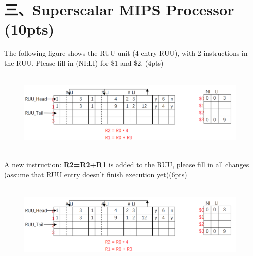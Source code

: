 \documentclass[UTF8]{ctexart}
\begin{document}
\section*{三、Superscalar MIPS Processor (10pts)}
The following figure shows the RUU unit (4-entry RUU), with 2 instructions in the RUU. Please fill in (NI:LI) for \$1 and \$2. (4pts)\\
\begin{figure}[H]                                             
    \centering                                                
    \includegraphics[width=14cm,height=4cm]{3-1.png}        
    \caption*{}                                                                              
\end{figure}  
A new instruction: \underline{\bfseries R2=R2+R1} is added to the RUU, please fill in all changes (assume that RUU entry doesn't finish execution yet)(6pts)\\
\begin{figure}[H]                                            
    \centering                                                
    \includegraphics[width=14cm,height=4cm]{3-1.png}        
    \caption*{}                                                                                 
\end{figure}  
\end{document}
